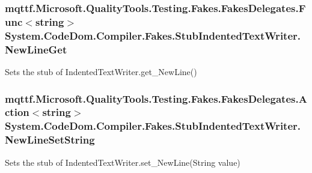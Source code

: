 \hypertarget{class_system_1_1_code_dom_1_1_compiler_1_1_fakes_1_1_stub_indented_text_writer_a22f92ceaf59e5523f4e4ed0dd0f1708d}{
\subsubsection[{New\-Line\-Get}]{\setlength{\rightskip}{0pt plus 5cm}mqttf.\-Microsoft.\-Quality\-Tools.\-Testing.\-Fakes.\-Fakes\-Delegates.\-Func$<$string$>$ System.\-Code\-Dom.\-Compiler.\-Fakes.\-Stub\-Indented\-Text\-Writer.\-New\-Line\-Get}}\label{class_system_1_1_code_dom_1_1_compiler_1_1_fakes_1_1_stub_indented_text_writer_a22f92ceaf59e5523f4e4ed0dd0f1708d}


Sets the stub of Indented\-Text\-Writer.\-get\-\_\-\-New\-Line()

\hypertarget{class_system_1_1_code_dom_1_1_compiler_1_1_fakes_1_1_stub_indented_text_writer_ae22013b8d863a5172a5e3b7ac87b6e7e}{
\subsubsection[{New\-Line\-Set\-String}]{\setlength{\rightskip}{0pt plus 5cm}mqttf.\-Microsoft.\-Quality\-Tools.\-Testing.\-Fakes.\-Fakes\-Delegates.\-Action$<$string$>$ System.\-Code\-Dom.\-Compiler.\-Fakes.\-Stub\-Indented\-Text\-Writer.\-New\-Line\-Set\-String}}\label{class_system_1_1_code_dom_1_1_compiler_1_1_fakes_1_1_stub_indented_text_writer_ae22013b8d863a5172a5e3b7ac87b6e7e}


Sets the stub of Indented\-Text\-Writer.\-set\-\_\-\-New\-Line(\-String value)

